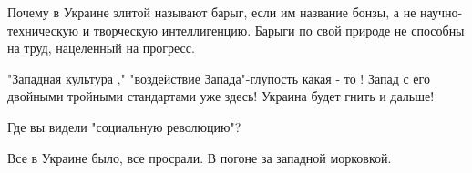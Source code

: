 \begin{itemize}
Почему в Украине элитой называют барыг, если им название бонзы, а не научно-техническую и творческую интеллигенцию. Барыги по свой природе не способны на труд, нацеленный на прогресс.

 
"Западная культура ," "воздействие Запада"-глупость какая - то ! Запад с его двойными тройными стандартами уже здесь! Украина будет гнить и дальше!

 
Где вы видели "социальную революцию"?

 
Все в Украине было, все просрали. В погоне за западной морковкой.

\end{itemize}

